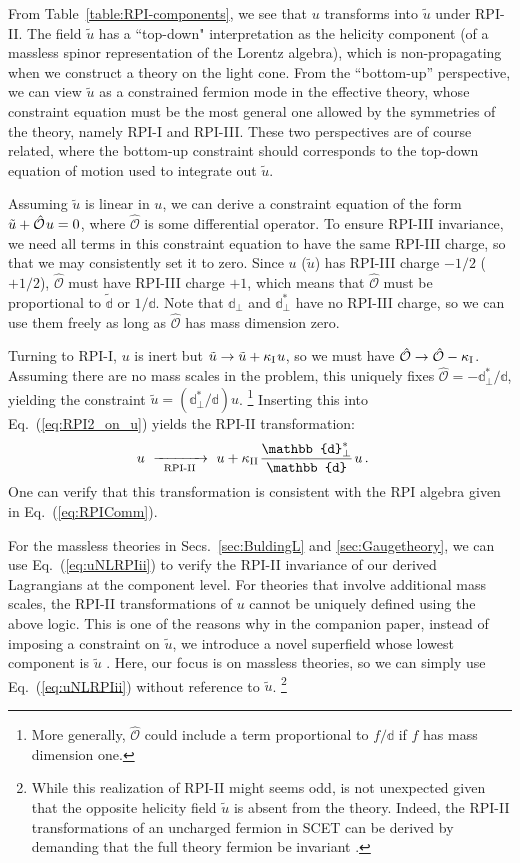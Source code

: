 \documentclass[12pt,document,nofootinbib,superscriptaddress,onecolumn,preprintnumbers,balancelastpage]{article}
\newcommand{\s}{\hspace{0.8pt}}
\newcommand{\PP}{\mathbb{d}}
\newcommand{\RPIii}{\,\,\xrightarrow[\hspace{5pt}\text{RPI-II}\hspace{5pt}]{}\,\,}
\DeclareRobustCommand{\Secs}[2]{Secs.~\ref{#1} and \ref{#2}}
\DeclareRobustCommand{\Tab}[1]{Table~\ref{#1}}
\DeclareRobustCommand{\Eq}[1]{Eq.~(\ref{#1})}
\newcommand{\uu}{\tilde u}
\begin{document}
\begin{spacing}{1.2}
From \Tab{table:RPI-components}, we see that $u$ transforms into $\uu$ under RPI-II.
%
The field $\uu$ has a ``top-down" interpretation as the helicity component (of a massless spinor representation of the Lorentz algebra), which is non-propagating when we construct a theory on the light cone.
%
From the ``bottom-up'' perspective, we can view $\uu$ as a constrained fermion mode in the effective theory, whose constraint equation must be the most general one allowed by the symmetries of the theory, namely RPI-I and RPI-III.
%
These two perspectives are of course related, where the bottom-up constraint should corresponds to the top-down equation of motion used to integrate out $\uu$.


Assuming $\uu$ is linear in $u$, we can derive a constraint equation of the form $\uu + \hat{\mathcal{O}}\s u = 0$, where $\hat{\mathcal{O}}$ is some differential operator.
%
To ensure RPI-III invariance, we need all terms in this constraint equation to have the same RPI-III charge, so that we may consistently set it to zero.
%
Since $u$ ($\uu$) has RPI-III charge $-1/2$ ($+1/2$), $\hat{\mathcal{O}}$ must have RPI-III charge $+1$, which means that $\hat{\mathcal{O}}$ must be proportional to $\tilde{\PP}$ or $1/\PP$.
%
Note that $\PP_\perp$ and $\PP_\perp^*$ have no RPI-III charge, so we can use them freely as long as $\hat{\mathcal{O}}$ has mass dimension zero.


Turning to RPI-I, $u$ is inert but $\uu \to \uu + \kappa_{\rm I} \s u$, so we must have $\hat{\mathcal{O}} \rightarrow \hat{\mathcal{O}} - \kappa_{\rm I}$.
%
Assuming there are no mass scales in the problem, this uniquely fixes $\hat{\mathcal{O}} = - \PP_\perp^* / \PP$, yielding the constraint $\uu = (\PP_\perp^*/\PP) u$.%
%
\footnote{More generally, $\hat{\mathcal{O}}$ could include a term proportional to $f/\PP$ if $f$ has mass dimension one.}
%
Inserting this into \Eq{eq:RPI2_on_u} yields the RPI-II transformation: 
%
%
\begin{align}
\label{eq:uNLRPIii}
u  &\RPIii u +  \kappa_{\rm II}\s \frac{\PP_\perp^*}{\PP}\s u\,.
\end{align}
%
One can verify that this transformation is consistent with the RPI algebra given in \Eq{eq:RPIComm}.


For the massless theories in \Secs{sec:BuldingL}{sec:Gaugetheory}, we can use \Eq{eq:uNLRPIii}  to verify the RPI-II invariance of our derived Lagrangians at the component level.
%
For theories that involve additional mass scales, the RPI-II transformations of $u$ cannot be uniquely defined using the above logic.
%
This is one of the reasons why in the companion paper, instead of imposing a constraint on $\uu$, we introduce a novel superfield whose lowest component is $\uu$ \cite{Cohen:2019gsc}.
%
Here, our focus is on massless theories, so we can simply use \Eq{eq:uNLRPIii} without reference to $\uu$.%
%
\footnote{While this  realization of RPI-II might seems odd, is not unexpected given that the opposite helicity field $\tilde{u}$ is absent from the theory. Indeed, the RPI-II transformations of an uncharged fermion in SCET can be derived by demanding that the full theory fermion be invariant \cite{Cohen:2016jzp}.}


\end{spacing}
\end{document}
